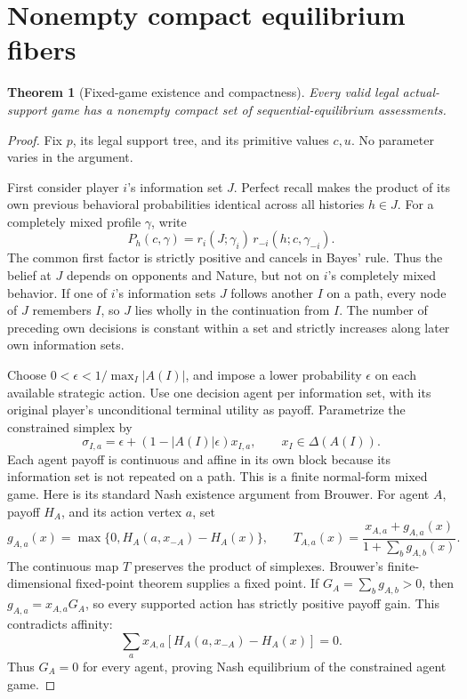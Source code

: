 \documentclass[11pt,a4paper]{article}
\numberwithin{equation}{section}
\newtheorem{theorem}{Theorem}
\theoremstyle{definition}
\begin{document}
\section{Nonempty compact equilibrium fibers}\label{sec:existence}
\begin{theorem}[Fixed-game existence and compactness]\label{thm:fibers}
Every valid legal actual-support game has a nonempty compact set of
sequential-equilibrium assessments.
\end{theorem}
\begin{proof}
Fix \(p\), its legal support tree, and its primitive values \(c,u\).
No parameter varies in the argument.

First consider player \(i\)'s information set \(J\).
Perfect recall makes the product of its own previous behavioral
probabilities identical across all histories \(h\in J\).
For a completely mixed profile \(\gamma\), write
\[
 P_h(c,\gamma)
 =r_i(J;\gamma_i)\,r_{-i}(h;c,\gamma_{-i}).
\]
The common first factor is strictly positive and cancels in Bayes'
rule. Thus the belief at \(J\) depends on opponents and Nature, but
not on \(i\)'s completely mixed behavior.
If one of \(i\)'s information sets \(J\) follows another \(I\) on a
path, every node of \(J\) remembers \(I\), so \(J\) lies wholly in
the continuation from \(I\).
The number of preceding own decisions is constant within a set and
strictly increases along later own information sets.

Choose \(0<\epsilon<1/\max_I|A(I)|\), and impose a lower probability
\(\epsilon\) on each available strategic action.
Use one decision agent per information set, with its original
player's unconditional terminal utility as payoff.
Parametrize the constrained simplex by
\[
 \sigma_{I,a}=\epsilon+(1-|A(I)|\epsilon)x_{I,a},
 \qquad x_I\in\Delta(A(I)).
\]
Each agent payoff is continuous and affine in its own block because
its information set is not repeated on a path.
This is a finite normal-form mixed game.
Here is its standard Nash existence argument from Brouwer.
For agent \(A\), payoff \(H_A\), and its action vertex \(a\), set
\[
 g_{A,a}(x)=\max\{0,H_A(a,x_{-A})-H_A(x)\},\qquad
 T_{A,a}(x)=\frac{x_{A,a}+g_{A,a}(x)}
                   {1+\sum_b g_{A,b}(x)}.
\]
The continuous map \(T\) preserves the product of simplexes.
Brouwer's finite-dimensional fixed-point theorem supplies a fixed
point. If \(G_A=\sum_b g_{A,b}>0\), then
\(g_{A,a}=x_{A,a}G_A\), so every supported action has strictly
positive payoff gain. This contradicts affinity:
\[
 \sum_a x_{A,a}[H_A(a,x_{-A})-H_A(x)]=0.
\]
Thus \(G_A=0\) for every agent, proving Nash equilibrium of the
constrained agent game.


\end{proof}
\end{document}
